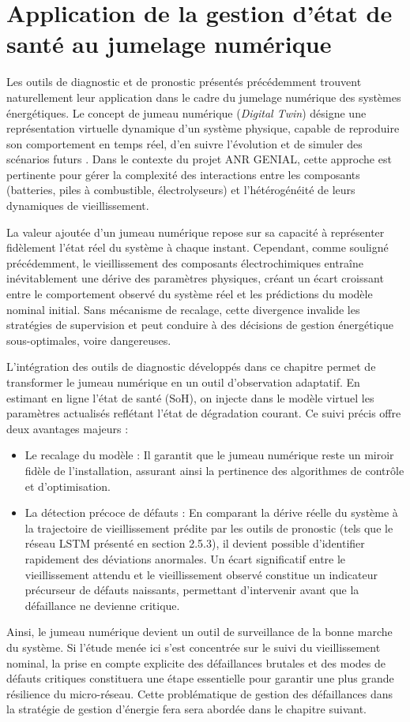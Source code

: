 \section{Application de la gestion d'état de santé au jumelage numérique}

Les outils de diagnostic et de pronostic présentés précédemment trouvent naturellement leur application dans le cadre du jumelage numérique des systèmes énergétiques. Le concept de jumeau numérique (\textit{Digital Twin}) désigne une représentation virtuelle dynamique d'un système physique, capable de reproduire son comportement en temps réel, d'en suivre l'évolution et de simuler des scénarios futurs \cite{tao_digital_2022}. Dans le contexte du projet ANR GENIAL, cette approche est pertinente pour gérer la complexité des interactions entre les composants (batteries, piles à combustible, électrolyseurs) et l'hétérogénéité de leurs dynamiques de vieillissement.

La valeur ajoutée d'un jumeau numérique repose sur sa capacité à représenter fidèlement l'état réel du système à chaque instant. Cependant, comme souligné précédemment, le vieillissement des composants électrochimiques entraîne inévitablement une dérive des paramètres physiques, créant un écart croissant entre le comportement observé du système réel et les prédictions du modèle nominal initial. Sans mécanisme de recalage, cette divergence invalide les stratégies de supervision et peut conduire à des décisions de gestion énergétique sous-optimales, voire dangereuses.

L'intégration des outils de diagnostic développés dans ce chapitre permet de transformer le jumeau numérique en un outil d'observation adaptatif. En estimant en ligne l'état de santé (SoH), on injecte dans le modèle virtuel les paramètres actualisés reflétant l'état de dégradation courant. Ce suivi précis offre deux avantages majeurs :
\begin{itemize}
    \item Le recalage du modèle : Il garantit que le jumeau numérique reste un miroir fidèle de l'installation, assurant ainsi la pertinence des algorithmes de contrôle et d'optimisation.
    \item La détection précoce de défauts : En comparant la dérive réelle du système à la trajectoire de vieillissement prédite par les outils de pronostic (tels que le réseau LSTM présenté en section 2.5.3), il devient possible d'identifier rapidement des déviations anormales. Un écart significatif entre le vieillissement attendu et le vieillissement observé constitue un indicateur précurseur de défauts naissants, permettant d'intervenir avant que la défaillance ne devienne critique.
\end{itemize}

Ainsi, le jumeau numérique devient un outil de surveillance de la bonne marche du système. Si l'étude menée ici s'est concentrée sur le suivi du vieillissement nominal, la prise en compte explicite des défaillances brutales et des modes de défauts critiques constituera une étape essentielle pour garantir une plus grande résilience du micro-réseau. Cette problématique de gestion des défaillances dans la stratégie de gestion d'énergie fera sera abordée dans le chapitre suivant.

\newpage